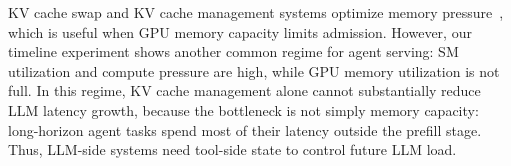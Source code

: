 KV cache swap and KV cache management systems optimize memory pressure~\cite{pan2025kvflow, kim2025kvzip, cai2025rkv, yang2025kvlink, prabhu2024vattention}, which is useful when GPU memory capacity limits admission.
However, our timeline experiment shows another common regime for agent serving: SM utilization and compute pressure are high, while GPU memory utilization is not full.
In this regime, KV cache management alone cannot substantially reduce LLM latency growth, because the bottleneck is not simply memory capacity: long-horizon agent tasks spend most of their latency outside the prefill stage.
Thus, LLM-side systems need tool-side state to control future LLM load.



